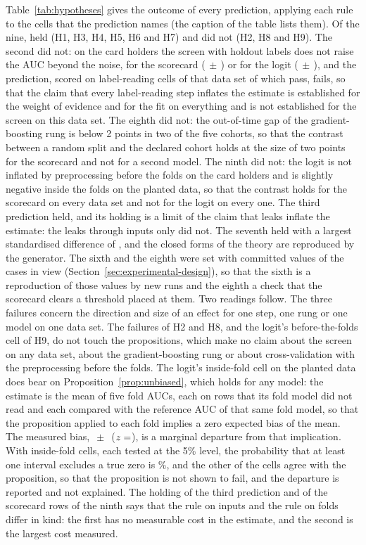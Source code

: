 Table~\ref{tab:hypotheses} gives the outcome of every prediction, applying each rule to the cells that the prediction names (the caption of the table lists them). Of the nine,  held (H1, H3, H4, H5, H6 and H7) and  did not (H2, H8 and H9). The second did not: on the card holders the screen with holdout labels does not raise the AUC beyond the noise, for the scorecard ($\,\pm\,$) or for the logit ($\,\pm\,$), and the prediction, scored on  label-reading cells of that data set of which  pass, fails, so that the claim that every label-reading step inflates the estimate is established for the weight of evidence and for the fit on everything and is not established for the screen on this data set. The eighth did not: the out-of-time gap of the gradient-boosting rung is below 2 points in two of the five cohorts, so that the contrast between a random split and the declared cohort holds at the size of two points for the scorecard and not for a second model. The ninth did not: the logit is not inflated by preprocessing before the folds on the card holders and is slightly negative inside the folds on the planted data, so that the contrast holds for the scorecard on every data set and not for the logit on every one. The third prediction held, and its holding is a limit of the claim that leaks inflate the estimate: the leaks through inputs only did not. The seventh held with a largest standardised difference of , and the closed forms of the theory are reproduced by the generator. The sixth and the eighth were set with committed values of the cases in view (Section~\ref{sec:experimental-design}), so that the sixth is a reproduction of those values by new runs and the eighth a check that the scorecard clears a threshold placed at them. Two readings follow. The three failures concern the direction and size of an effect for one step, one rung or one model on one data set. The failures of H2 and H8, and the logit's before-the-folds cell of H9, do not touch the propositions, which make no claim about the screen on any data set, about the gradient-boosting rung or about cross-validation with the preprocessing before the folds. The logit's inside-fold cell on the planted data does bear on Proposition~\ref{prop:unbiased}, which holds for any model: the estimate is the mean of five fold AUCs, each on rows that its fold model did not read and each compared with the reference AUC of that same fold model, so that the proposition applied to each fold implies a zero expected bias of the mean. The measured bias, $\,\pm\,$ ($z=\nv{h9.in.z}$), is a marginal departure from that implication. With  inside-fold cells, each tested at the 5\% level, the probability that at least one interval excludes a true zero is \%, and the other  of the  cells agree with the proposition, so that the proposition is not shown to fail, and the departure is reported and not explained. The holding of the third prediction and of the scorecard rows of the ninth says that the rule on inputs and the rule on folds differ in kind: the first has no measurable cost in the estimate, and the second is the largest cost measured.
